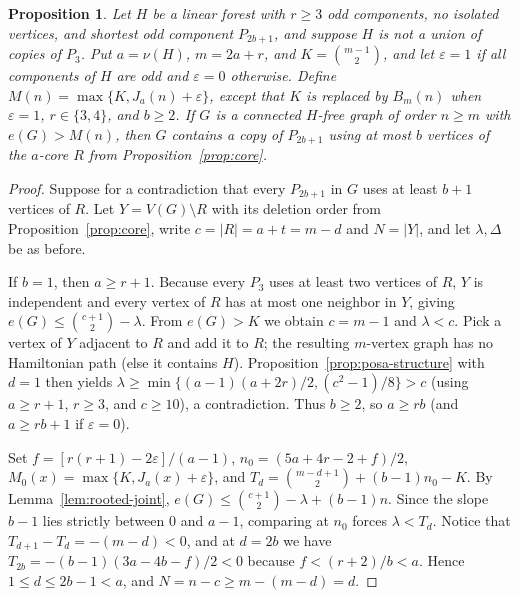 \documentclass[10pt]{article}
\theoremstyle{compactplain}
\newtheorem{proposition}[theorem]{Proposition}
\theoremstyle{remark}\newtheorem{remark}[theorem]{Remark}
\begin{document}
\begin{proposition}\label{prop:exists-low-core-path}
Let $H$ be a linear forest with $r\ge3$ odd components, no isolated
vertices, and shortest odd component $P_{2b+1}$, and suppose $H$ is not
a union of copies of $P_3$. Put $a=\nu(H)$, $m=2a+r$, and
$K=\binom{m-1}{2}$, and let $\varepsilon=1$ if all components of $H$ are
odd and $\varepsilon=0$ otherwise. Define
$M(n)=\max\{K,J_a(n)+\varepsilon\}$, except that $K$ is replaced by
$B_m(n)$ when $\varepsilon=1$, $r\in\{3,4\}$, and $b\ge2$. If $G$ is a
connected $H$-free graph of order $n\ge m$ with $e(G)>M(n)$, then $G$
contains a copy of $P_{2b+1}$ using at most $b$ vertices of the $a$-core
$R$ from Proposition~\ref{prop:core}.
\end{proposition}
\begin{proof}
Suppose for a contradiction that every $P_{2b+1}$ in $G$ uses at least
$b+1$ vertices of $R$. Let $Y=V(G)\setminus R$ with its deletion order
from Proposition~\ref{prop:core}, write $c=|R|=a+t=m-d$ and $N=|Y|$, and
let $\lambda,\Delta$ be as before.

If $b=1$, then $a\ge r+1$. Because every $P_3$ uses at least two
vertices of $R$, $Y$ is independent and every vertex of $R$ has at most
one neighbor in $Y$, giving $e(G)\le\binom{c+1}{2}-\lambda$. From
$e(G)>K$ we obtain $c=m-1$ and $\lambda<c$. Pick a vertex of $Y$
adjacent to $R$ and add it to $R$; the resulting $m$-vertex graph has no
Hamiltonian path (else it contains $H$). Proposition~\ref{prop:posa-structure}
with $d=1$ then yields
$\lambda\ge\min\{(a-1)(a+2r)/2,(c^2-1)/8\}>c$ (using $a\ge r+1$,
$r\ge3$, and $c\ge10$), a contradiction. Thus $b\ge2$, so $a\ge rb$ (and
$a\ge rb+1$ if $\varepsilon=0$).

Set $f=[r(r+1)-2\varepsilon]/(a-1)$, $n_0=(5a+4r-2+f)/2$,
$M_0(x)=\max\{K,J_a(x)+\varepsilon\}$, and
$T_d=\binom{m-d+1}{2}+(b-1)n_0-K$. By Lemma~\ref{lem:rooted-joint},
$e(G)\le\binom{c+1}{2}-\lambda+(b-1)n$. Since the slope $b-1$ lies
strictly between $0$ and $a-1$, comparing at $n_0$ forces
$\lambda<T_d$. Notice that $T_{d+1}-T_d=-(m-d)<0$, and at $d=2b$ we have
$T_{2b}=-(b-1)(3a-4b-f)/2<0$ because $f<(r+2)/b<a$. Hence
$1\le d\le2b-1<a$, and $N=n-c\ge m-(m-d)=d$.


\end{proof}
\end{document}
